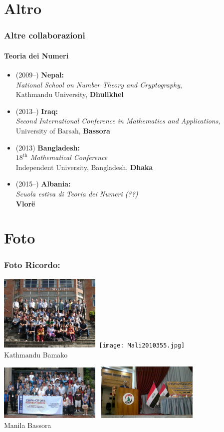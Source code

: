 \documentclass[10pt,final]{beamer} %
\begin{document}
\section{Altro}
\begin{frame}
\frametitle{Altre collaborazioni}
\framesubtitle{Teoria dei Numeri}
\begin{itemize}
\item (2009--) \textbf{Nepal:}\\
\textsl{National School on Number Theory and Cryptography}, \\
Kathmandu University, \textbf{Dhulikhel}
\item (2013--) \textbf{Iraq:}\\
\textsl{Second International Conference in Mathematics and Applications,}\\
University of Barsah, \textbf{Bassora}
\item (2013) \textbf{Bangladesh:}\\
\textsl{$18^{\text{th}}$ Mathematical Conference}\\
Independent University, Bangladesh, \textbf{Dhaka}
 \item (2015--) \textbf{Albania:}\\
\textsl{Scuola estiva di Teoria dei Numeri (??)}\\
\textbf{Vlor\"e}
\end{itemize}
\end{frame}

\section{Foto}
\begin{frame}
\frametitle{Foto Ricordo:}
\includegraphics[width=4.85cm]{Kathmandu.jpg}\ 
\texttt{[image: Mali2010355.jpg]}\\
Kathmandu \hfill Bamako\bigskip

\includegraphics[width=4.85cm]{CIMG0516.JPG} \
\includegraphics[width=4.85cm]{2013-10-23-141.jpg}\\
Manila \hfill Bassora

\end{frame}
\end{document}
